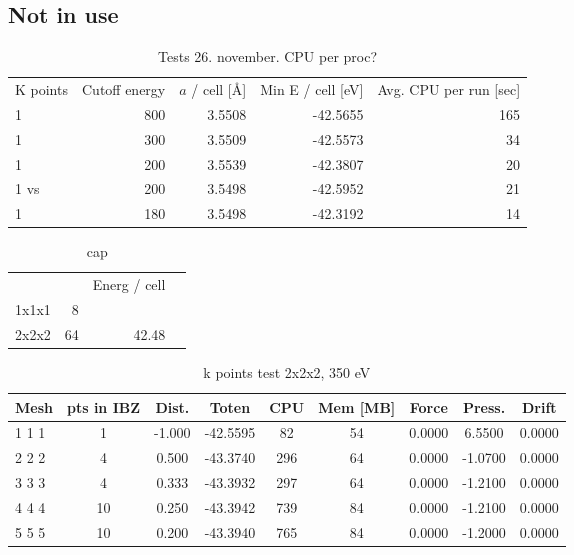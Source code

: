 \documentclass[11pt,bibliography=totoc,index=totoc]{scrbook}   %
\begin{document}
\subsection{Not in use}

\begin{table}[htbp]
  \centering
  \begin{tabular}{lrrrr}
    K points    & Cutoff energy & $a$ / cell [\AA]   & Min E / cell [eV] & Avg. CPU per run [sec]      \\
    1           & 800           & 3.5508             & -42.5655          & 165      \\
    1           & 300           & 3.5509             & -42.5573          & 34       \\
    1           & 200           & 3.5539             & -42.3807          & 20       \\
    1 vs        & 200           & 3.5498             & -42.5952          & 21       \\
    1           & 180           & 3.5498             & -42.3192          & 14       \\
  \end{tabular}
  \caption{Tests 26. november. CPU per proc?}
\end{table}


\begin{table}[htbp]
  \centering
  \begin{tabular}{lrrr}
          &     & Energ / cell  \\
    1x1x1 &   8 &               \\
    2x2x2 &  64 & 42.48         \\
  \end{tabular}
  \caption{cap}
  \label{tab:supertests}
\end{table}


\begin{table}[htbp]
  \centering
  \begin{tabular}{lcccccccc}\toprule
    Mesh	& pts in IBZ    & Dist. & Toten     & CPU	& Mem [MB]  & Force	    & Press.	& Drift  \\\midrule
    1 1 1	&  1    	    &-1.000	& -42.5595	& 82	& 54        & 0.0000	& 6.5500	& 0.0000 \\
    2 2 2	&  4    	    & 0.500	& -43.3740	& 296	& 64        & 0.0000	& -1.0700	& 0.0000 \\
    3 3 3	&  4    	    & 0.333	& -43.3932	& 297   & 64        & 0.0000	& -1.2100	& 0.0000 \\
    4 4 4	& 10    	    & 0.250	& -43.3942	& 739	& 84        & 0.0000	& -1.2100	& 0.0000 \\
    5 5 5	& 10	        & 0.200	& -43.3940	& 765	& 84        & 0.0000	& -1.2000	& 0.0000 \\\bottomrule
  \end{tabular}
  \caption{k points test 2x2x2, 350 eV}
  \label{tab:ktest2}
\end{table}
\end{document}
